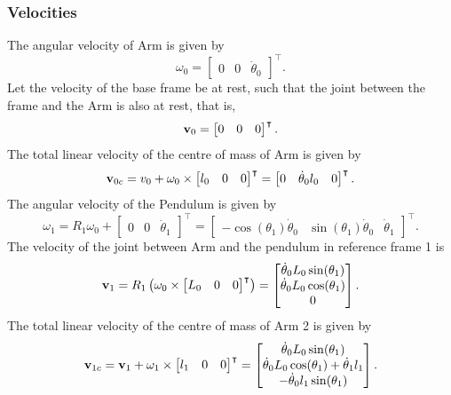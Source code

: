 \subsubsection{Velocities}
The angular velocity of Arm is given by
\begin{equation}
	\omega_0 = 	\begin{bmatrix}
					0 & 0 & \dot{\theta}_0
				\end{bmatrix}^\intercal.
\end{equation}
Let the velocity of the base frame be at rest, such that the joint
between the frame and the Arm is also at rest, that is,
\begin{equation}
	\text{\textbf{v}}_0 = 	\begin{bmatrix}
					0 & 0 & 0
			\end{bmatrix}^\intercal.
\end{equation}
The total linear velocity of the centre of mass of Arm is
given by
\begin{equation}
	\text{\textbf{v}}_{0c} = v_0+\omega_0\times\begin{bmatrix}
					l_0 & 0 & 0
				\end{bmatrix}^\intercal = \begin{bmatrix}
				0 & \dot{\theta}_0l_0 & 0
				\end{bmatrix}^\intercal.
\end{equation}
The angular velocity of the Pendulum is given by
\begin{equation}
\omega_1 = R_1\omega_0 + \begin{bmatrix}
				0 & 0 & \dot{\theta}_1
			\end{bmatrix}^\intercal = 
			\begin{bmatrix}
				-\cos(\theta_1)\dot{\theta}_0 & \sin(\theta_1)\dot{\theta}_0 & \dot{\theta}_1
			\end{bmatrix}^\intercal.
\end{equation}
The velocity of the joint between Arm and the pendulum in
reference frame 1 is
\begin{equation}
	\text{\textbf{v}}_{1} = R_1\left( \omega_0\times	\begin{bmatrix}
									L_0 & 0 & 0
									\end{bmatrix}^\intercal \right) = 
	\begin{bmatrix}
		\dot{\theta}_0L_0\sin(\theta_1)\\
		\dot{\theta}_0L_0\cos(\theta_1)\\
		0
	\end{bmatrix}.
\end{equation}
The total linear velocity of the centre of mass of Arm 2 is
given by
\begin{equation}
	\text{\textbf{v}}_{1c} = \text{\textbf{v}}_1+\omega_1\times\begin{bmatrix}
																	l_1 & 0& 0
															\end{bmatrix}^\intercal=
	\begin{bmatrix}
		\dot{\theta}_0L_0\sin(\theta_1)\\
		\dot{\theta}_0L_0\cos(\theta_1) + \dot{\theta}_1l_1\\
		-\dot{\theta}_0l_1\sin(\theta_1)
	\end{bmatrix}.														
\end{equation}
